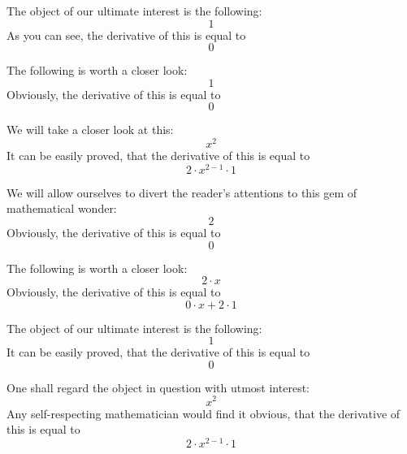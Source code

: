 \documentclass{article}
\begin{document}
The object of our ultimate interest is the following:
\begin{equation}
1 
\end{equation}
As you can see, the derivative of this is equal to
\begin{equation}
0 
\end{equation}

The following is worth a closer look:
\begin{equation}
1 
\end{equation}
Obviously, the derivative of this is equal to
\begin{equation}
0 
\end{equation}

We will take a closer look at this:
\begin{equation}
x ^{2 } 
\end{equation}
It can be easily proved, that the derivative of this is equal to
\begin{equation}
2 \cdot x ^{2 - 1 } \cdot 1 
\end{equation}

We will allow ourselves to divert the reader's attentions to this gem of mathematical wonder:
\begin{equation}
2 
\end{equation}
Obviously, the derivative of this is equal to
\begin{equation}
0 
\end{equation}

The following is worth a closer look:
\begin{equation}
2 \cdot x 
\end{equation}
Obviously, the derivative of this is equal to
\begin{equation}
0 \cdot x + 2 \cdot 1 
\end{equation}

The object of our ultimate interest is the following:
\begin{equation}
1 
\end{equation}
It can be easily proved, that the derivative of this is equal to
\begin{equation}
0 
\end{equation}

One shall regard the object in question with utmost interest:
\begin{equation}
x ^{2 } 
\end{equation}
Any self-respecting mathematician would find it obvious, that the derivative of this is equal to
\begin{equation}
2 \cdot x ^{2 - 1 } \cdot 1 
\end{equation}
\end{document}
